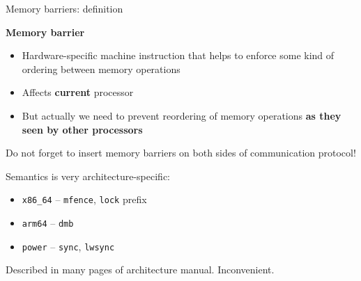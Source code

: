 \begin{frame}{Memory barriers: definition}

\textbf{Memory barrier}
\begin{itemize}
    \item Hardware-specific machine instruction that helps to enforce some kind of ordering between memory operations 
    \pause
    \item Affects \textbf{current} processor
    \pause
    \item But actually we need to prevent reordering of memory operations \textbf{as they seen by other processors}
\end{itemize}
\pause
Do not forget to insert memory barriers on both sides of communication protocol!

\pause
Semantics is very architecture-specific:
\begin{itemize}
    \item \texttt{x86\_64}  -- \texttt{mfence}, \texttt{lock} prefix
    \item \texttt{arm64} -- \texttt{dmb}
    \item \texttt{power} -- \texttt{sync}, \texttt{lwsync}
\end{itemize}

\pause
Described in many pages of architecture manual. \pause Inconvenient.

\end{frame}


